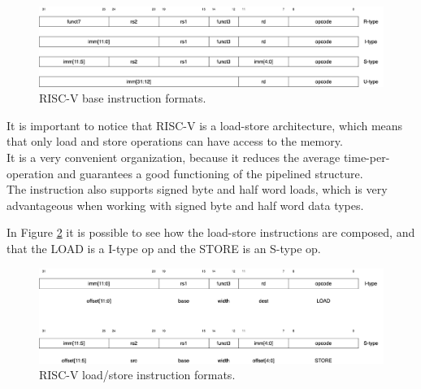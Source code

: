 \begin{figure}[H]
    \centering
    \includegraphics[scale = 0.27]{Chapter_1/img/riscv-base-instruction-formats.png}
    \caption{RISC-V base instruction formats. \cite{RISC-V-Instruction-Set-Manual}}
    \label{riscv-base-instruction-formats}
\end{figure}

It is important to notice that RISC-V is a load-store architecture, which means that only load and store operations can have access to the memory.\\
It is a very convenient organization, because it reduces the average time-per-operation and guarantees a good functioning of the pipelined structure.\\

The instruction also supports signed byte and half word loads, which is very advantageous when working with signed byte and half word data types.

In Figure \ref{riscv-load-store} it is possible to see how the load-store instructions are composed, and that the LOAD is a I-type op and the STORE is an S-type op.

\begin{figure}[H]
    \centering
    \includegraphics[scale = 0.27]{Chapter_1/img/riscv-load-store.png}
    \caption{RISC-V load/store instruction formats. \cite{RISC-V-Instruction-Set-Manual}}
    \label{riscv-load-store}
\end{figure}


